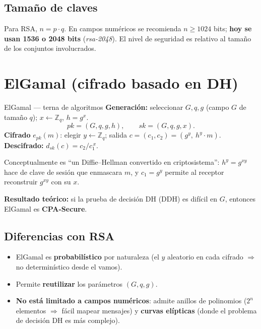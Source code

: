 \documentclass[11pt,a4paper]{article}
\newcommand{\Zn}{\mathbb{Z}}
\begin{document}
\subsection{Tamaño de claves}
\begin{slidebox}
Para RSA, $n=p\cdot q$. En campos numéricos se recomienda $n\ge 1024$ bits; \textbf{hoy se
usan 1536 o 2048 bits} (\emph{rsa-2048}). El nivel de seguridad es relativo al tamaño de los
conjuntos involucrados.
\end{slidebox}

\section{ElGamal (cifrado basado en DH)}

\begin{defbox}{ElGamal — terna de algoritmos}
\textbf{Generación:} seleccionar $G,q,g$ (campo $G$ de tamaño $q$); $x\leftarrow\Zn_q$,
$h=g^x$.
\[
  pk=(G,q,g,h),\qquad sk=(G,q,g,x).
\]
\textbf{Cifrado} $e_{pk}(m)$: elegir $y\leftarrow\Zn_q$; salida
$c=(c_1,c_2)=(g^{y},\ h^{y}\cdot m)$.\\[3pt]
\textbf{Descifrado:} \quad $d_{sk}(c) = c_2 / c_1^{\,x}$.
\end{defbox}

\noindent Conceptualmente es ``un Diffie--Hellman convertido en criptosistema'': $h^y=g^{xy}$
hace de clave de sesión que enmascara $m$, y $c_1=g^y$ permite al receptor reconstruir
$g^{xy}$ con su $x$.

\begin{slidebox}
\textbf{Resultado teórico:} si la prueba de decisión DH (DDH) es difícil en $G$, entonces
ElGamal es \textbf{CPA-Secure}.
\end{slidebox}

\subsection{Diferencias con RSA}
\begin{itemize}[leftmargin=1.4em,itemsep=1pt]
  \item ElGamal es \textbf{probabilístico} por naturaleza (el $y$ aleatorio en cada cifrado
        $\Rightarrow$ no determinístico desde el vamos).
  \item Permite \textbf{reutilizar} los parámetros $(G,q,g)$.
  \item \textbf{No está limitado a campos numéricos}: admite anillos de polinomios
        ($2^n$ elementos $\Rightarrow$ fácil mapear mensajes) y \textbf{curvas elípticas}
        (donde el problema de decisión DH es más complejo).
\end{itemize}
\end{document}
